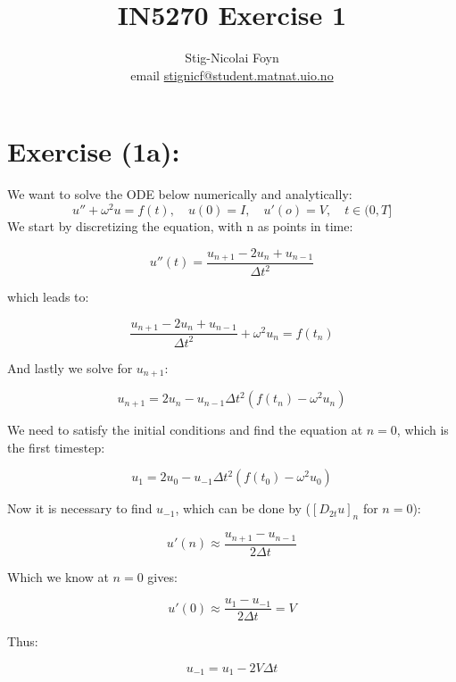 \documentclass{article}
\title{IN5270 Exercise 1}
\author{Stig-Nicolai Foyn \\ email \href{mailto:stignicf@student.matnat.uio.no}{stignicf@student.matnat.uio.no}}
\begin{document}

\section{Exercise (1a):}
\label{sec:1a}
We want to solve the ODE below numerically and analytically:
%
\begin{equation*}
    u'' + \omega^2 u = f(t), \quad u(0) = I, \quad u'(o) = V, \quad t\in (0,T]
\end{equation*}
%
We start by discretizing the equation, with n as points in time:

\begin{equation}
    u''(t) = \frac{u_{n+1} -2u_{n} + u_{n-1}}{\Delta t^2}
\end{equation}

which leads to:

\begin{equation*}
    \frac{u_{n+1} -2u_{n} + u_{n-1}}{\Delta t^2} + \omega^2 u_{n} = f(t_n)
\end{equation*}

And lastly we solve for $u_{n+1}$:

\begin{equation*}
    u_{n+1} = 2u_{n} - u_{n-1} \Delta t^2(f(t_n) - \omega^2 u_{n})
\end{equation*}

We need to satisfy the initial conditions and find the equation at $n=0$, which is the first timestep:

\begin{equation*}
    u_{1} = 2u_{0} - u_{-1} \Delta t^2(f(t_0) - \omega^2 u_{0})
\end{equation*}

Now it is necessary to find $u_{-1}$, which can be done by ($[D_{2t}u]_n$ for $n=0$):

\begin{equation}
    u'(n) \approx \frac{u_{n+1} - u_{n-1}}{2\Delta t}
\end{equation}

Which we know at $n=0$ gives:

\begin{equation*}
    u'(0) \approx \frac{u_{1} - u_{-1}}{2\Delta t} = V
\end{equation*}

Thus:

\begin{equation*}
    u_{-1} = u_{1} - 2V\Delta t
\end{equation*}
\end{document}

